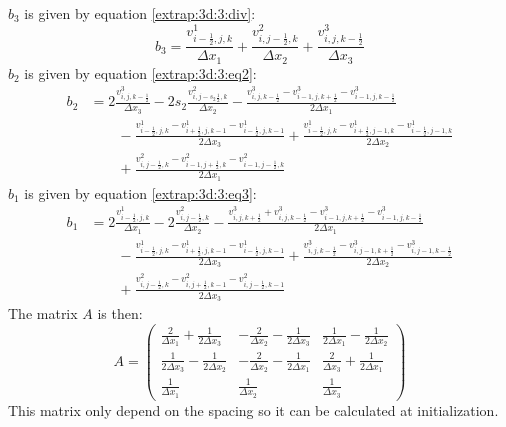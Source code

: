 $b_3$ is given by equation \ref{extrap:3d:3:div}:
\begin{equation}
 b_3=\frac{v^{1}_{i-\frac{1}{2},j,k}}{\Delta x_1}+\frac{v^{2}_{i,j-\frac{1}{2},k}}{\Delta x_2}+\frac{v^{3}_{i,j,k-\frac{1}{2}}}{\Delta x_3}
\end{equation}
$b_2$ is given by equation \ref{extrap:3d:3:eq2}:
\begin{equation}
\begin{split}
 b_2&=2\frac{v^{3}_{i,j,k-\frac{1}{2}}}{\Delta x_3}-2s_2\frac{v^{2}_{i,j-s_2\frac{1}{2},k}}{\Delta x_2}
	-\frac{v^{3}_{i,j,k-\frac{1}{2}}-v^{3}_{i-1,j,k+\frac{1}{2}}-v^{3}_{i-1,j,k-\frac{1}{2}}}{2\Delta x_1}\\
	&\qquad -\frac{v^1_{i-\frac{1}{2},j,k}-v^{1}_{i+\frac{1}{2},j,k-1}-v^{1}_{i-\frac{1}{2},j,k-1}}{2\Delta x_3}
	+\frac{v^{1}_{i-\frac{1}{2},j,k}-v^{1}_{i+\frac{1}{2},j-1,k}-v^{1}_{i-\frac{1}{2},j-1,k}}{2\Delta x_2}\\
	&\qquad +\frac{v^2_{i,j-\frac{1}{2},k}-v^{2}_{i-1,j+\frac{1}{2},k}-v^{2}_{i-1,j-\frac{1}{2},k}}{2\Delta x_1}
\end{split}
\end{equation}
$b_1$ is given by equation \ref{extrap:3d:3:eq3}:
\begin{equation}
 \begin{split}
	b_1&=2\frac{v^{1}_{i-\frac{1}{2},j,k}}{\Delta x_1}-2\frac{v^{2}_{i,j-\frac{1}{2},k}}{\Delta x_2}
	-\frac{v^{3}_{i,j,k+\frac{1}{2}}+v^{3}_{i,j,k-\frac{1}{2}}-v^{3}_{i-1,j,k+\frac{1}{2}}-v^{3}_{i-1,j,k-\frac{1}{2}}}{2\Delta x_1}\\
	&\qquad -\frac{v^1_{i-\frac{1}{2},j,k}-v^{1}_{i+\frac{1}{2},j,k-1}-v^{1}_{i-\frac{1}{2},j,k-1}}{2\Delta x_3}
	+\frac{v^{3}_{i,j,k-\frac{1}{2}}-v^{3}_{i,j-1,k+\frac{1}{2}}-v^{3}_{i,j-1,k-\frac{1}{2}}}{2\Delta x_2}\\
	&\qquad +\frac{v^2_{i,j-\frac{1}{2},k}-v^{2}_{i,j+\frac{1}{2},k-1}-v^{2}_{i,j-\frac{1}{2},k-1}}{2\Delta x_3}
	\end{split}
\end{equation}
The matrix $A$ is then:
\begin{equation}
 A=\begin{pmatrix}
    \frac{2}{\Delta x_1}+\frac{1}{2\Delta x_3}&-\frac{2}{\Delta x_2}-\frac{1}{2\Delta x_3}&\frac{1}{2\Delta x_1}-\frac{1}{2\Delta x_2}\\
    \frac{1}{2\Delta x_3}-\frac{1}{2\Delta x_2}&-\frac{2}{\Delta x_2}-\frac{1}{2\Delta x_1}&\frac{2}{\Delta x_3}+\frac{1}{2\Delta x_1}\\
    \frac{1}{\Delta x_1}&\frac{1}{\Delta x_2}&\frac{1}{\Delta x_3}
   \end{pmatrix}
\end{equation}
This matrix only depend on the spacing so it can be calculated at initialization.

